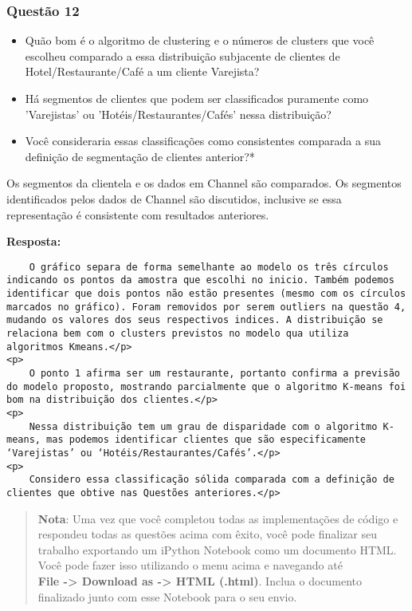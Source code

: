 \documentclass[11pt]{article}
\providecommand{\tightlist}{%
      \setlength{\itemsep}{0pt}\setlength{\parskip}{0pt}}
\begin{document}
    \subsubsection{Questão 12}\label{questuxe3o-12}

\begin{itemize}
\tightlist
\item
  Quão bom é o algoritmo de clustering e o números de clusters que você
  escolheu comparado a essa distribuição subjacente de clientes de
  Hotel/Restaurante/Café a um cliente Varejista?
\item
  Há segmentos de clientes que podem ser classificados puramente como
  'Varejistas' ou 'Hotéis/Restaurantes/Cafés' nessa distribuição?
\item
  Você consideraria essas classificações como consistentes comparada a
  sua definição de segmentação de clientes anterior?*
\end{itemize}

     Os segmentos da clientela e os dados em Channel são comparados. Os
segmentos identificados pelos dados de Channel são discutidos, inclusive
se essa representação é consistente com resultados anteriores. 

    \textbf{Resposta:}

\begin{verbatim}
    O gráfico separa de forma semelhante ao modelo os três círculos indicando os pontos da amostra que escolhi no inicio. Também podemos identificar que dois pontos não estão presentes (mesmo com os círculos marcados no gráfico). Foram removidos por serem outliers na questão 4, mudando os valores dos seus respectivos indices. A distribuição se relaciona bem com o clusters previstos no modelo qua utiliza algoritmos Kmeans.</p>
<p>
    O ponto 1 afirma ser um restaurante, portanto confirma a previsão do modelo proposto, mostrando parcialmente que o algoritmo K-means foi bom na distribuição dos clientes.</p>
<p>
    Nessa distribuição tem um grau de disparidade com o algoritmo K-means, mas podemos identificar clientes que são especificamente ‘Varejistas’ ou ‘Hotéis/Restaurantes/Cafés’.</p>
<p>
    Considero essa classificação sólida comparada com a definição de clientes que obtive nas Questões anteriores.</p>
\end{verbatim}

    \begin{quote}
\textbf{Nota}: Uma vez que você completou todas as implementações de
código e respondeu todas as questões acima com êxito, você pode
finalizar seu trabalho exportando um iPython Notebook como um documento
HTML. Você pode fazer isso utilizando o menu acima e navegando até\\
\textbf{File -\textgreater{} Download as -\textgreater{} HTML (.html)}.
Inclua o documento finalizado junto com esse Notebook para o seu envio.
\end{quote}


    
    
    
    
\end{document}
